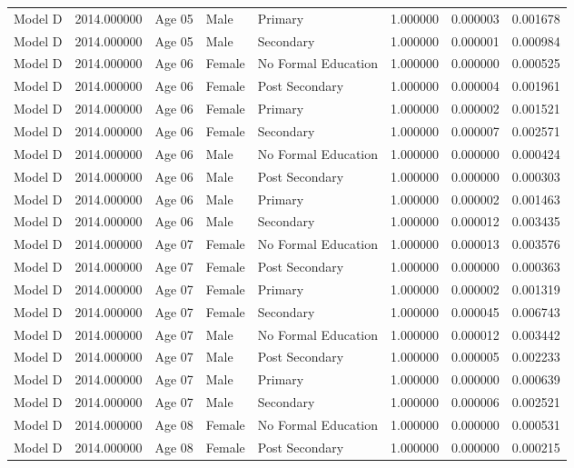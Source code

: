 \begin{table}[ht]
\begin{tabular}{lrlllrrr}
Model D & 2014.000000 & Age 05 & Male & Primary & 1.000000 & 0.000003 & 0.001678 \\
Model D & 2014.000000 & Age 05 & Male & Secondary & 1.000000 & 0.000001 & 0.000984 \\
Model D & 2014.000000 & Age 06 & Female & No Formal Education & 1.000000 & 0.000000 & 0.000525 \\
Model D & 2014.000000 & Age 06 & Female & Post Secondary & 1.000000 & 0.000004 & 0.001961 \\
Model D & 2014.000000 & Age 06 & Female & Primary & 1.000000 & 0.000002 & 0.001521 \\
Model D & 2014.000000 & Age 06 & Female & Secondary & 1.000000 & 0.000007 & 0.002571 \\
Model D & 2014.000000 & Age 06 & Male & No Formal Education & 1.000000 & 0.000000 & 0.000424 \\
Model D & 2014.000000 & Age 06 & Male & Post Secondary & 1.000000 & 0.000000 & 0.000303 \\
Model D & 2014.000000 & Age 06 & Male & Primary & 1.000000 & 0.000002 & 0.001463 \\
Model D & 2014.000000 & Age 06 & Male & Secondary & 1.000000 & 0.000012 & 0.003435 \\
Model D & 2014.000000 & Age 07 & Female & No Formal Education & 1.000000 & 0.000013 & 0.003576 \\
Model D & 2014.000000 & Age 07 & Female & Post Secondary & 1.000000 & 0.000000 & 0.000363 \\
Model D & 2014.000000 & Age 07 & Female & Primary & 1.000000 & 0.000002 & 0.001319 \\
Model D & 2014.000000 & Age 07 & Female & Secondary & 1.000000 & 0.000045 & 0.006743 \\
Model D & 2014.000000 & Age 07 & Male & No Formal Education & 1.000000 & 0.000012 & 0.003442 \\
Model D & 2014.000000 & Age 07 & Male & Post Secondary & 1.000000 & 0.000005 & 0.002233 \\
Model D & 2014.000000 & Age 07 & Male & Primary & 1.000000 & 0.000000 & 0.000639 \\
Model D & 2014.000000 & Age 07 & Male & Secondary & 1.000000 & 0.000006 & 0.002521 \\
Model D & 2014.000000 & Age 08 & Female & No Formal Education & 1.000000 & 0.000000 & 0.000531 \\
Model D & 2014.000000 & Age 08 & Female & Post Secondary & 1.000000 & 0.000000 & 0.000215 \\

\end{tabular}
\end{table}
